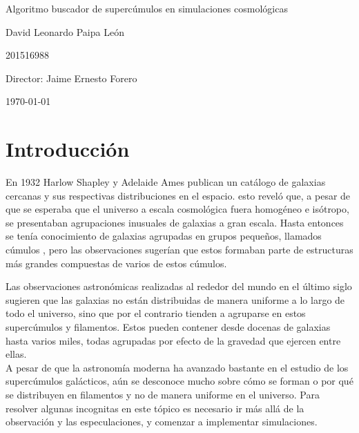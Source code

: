 \documentclass[12pt]{article}
\begin{document}
\begin{center}
\Huge
Algoritmo buscador de supercúmulos en simulaciones cosmológicas 

\vspace{3mm}
\Large David Leonardo Paipa León


\large
201516988


\vspace{2mm}
\Large
Director: Jaime Ernesto Forero

\normalsize
\vspace{2mm}

\today
\end{center}


\normalsize
\section{Introducción}


En 1932 Harlow Shapley y Adelaide Ames publican un catálogo de galaxias cercanas y sus respectivas distribuciones en el espacio. esto reveló que, a pesar de que se esperaba que el universo a escala cosmológica fuera homogéneo e isótropo,  se presentaban agrupaciones inusuales de galaxias a gran escala. Hasta entonces se tenía conocimiento de galaxias agrupadas en grupos pequeños, llamados cúmulos , pero las observaciones sugerían que estos formaban parte de estructuras más grandes compuestas de varios de estos cúmulos.  


Las observaciones astronómicas realizadas al rededor del mundo en el último siglo sugieren que las galaxias no están distribuidas de manera uniforme a lo largo de todo el universo, sino que por el contrario tienden a agruparse en estos supercúmulos y filamentos. Estos pueden contener desde docenas de galaxias hasta varios miles, todas agrupadas por efecto de la gravedad que ejercen entre ellas. \\

A pesar de que la astronomía moderna ha avanzado bastante en el estudio de los supercúmulos galácticos, aún se desconoce mucho sobre cómo se forman o por qué se distribuyen en filamentos y no de manera uniforme en el universo. Para resolver algunas incognitas en este tópico es necesario ir más allá de la observación y las especulaciones, y comenzar a implementar simulaciones.\\
\end{document}

